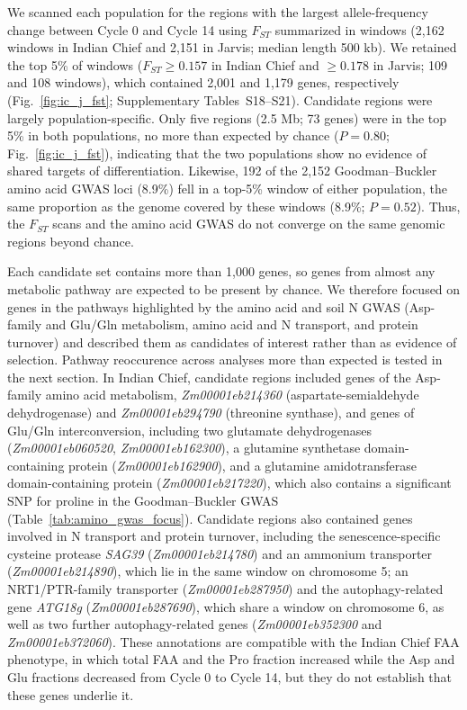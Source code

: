 We scanned each population for the regions with the largest allele-frequency change between Cycle 0 and Cycle 14 using $F_{ST}$ summarized in windows (2,162 windows in Indian Chief and 2,151 in Jarvis; median length 500 kb). We retained the top 5\% of windows ($F_{ST} \ge 0.157$ in Indian Chief and $\ge 0.178$ in Jarvis; 109 and 108 windows), which contained 2,001 and 1,179 genes, respectively (Fig.~\ref{fig:ic_j_fst}; Supplementary Tables~S18--S21). Candidate regions were largely population-specific. Only five regions (2.5 Mb; 73 genes) were in the top 5\% in both populations, no more than expected by chance ($P = 0.80$; Fig.~\ref{fig:ic_j_fst}), indicating that the two populations show no evidence of shared targets of differentiation. Likewise, 192 of the 2,152 Goodman--Buckler amino acid GWAS loci (8.9\%) fell in a top-5\% window of either population, the same proportion as the genome covered by these windows (8.9\%; $P = 0.52$). Thus, the $F_{ST}$ scans and the amino acid GWAS do not converge on the same genomic regions beyond chance.

Each candidate set contains more than 1,000 genes, so genes from almost any metabolic pathway are expected to be present by chance. We therefore focused on genes in the pathways highlighted by the amino acid and soil N GWAS (Asp-family and Glu/Gln metabolism, amino acid and N transport, and protein turnover) and described them as candidates of interest rather than as evidence of selection. Pathway reoccurence across analyses more than expected is tested in the next section. In Indian Chief, candidate regions included genes of the Asp-family amino acid metabolism, \textit{Zm00001eb214360} (aspartate-semialdehyde dehydrogenase) and \textit{Zm00001eb294790} (threonine synthase), and genes of Glu/Gln interconversion, including two glutamate dehydrogenases (\textit{Zm00001eb060520}, \textit{Zm00001eb162300}), a glutamine synthetase domain-containing protein (\textit{Zm00001eb162900}), and a glutamine amidotransferase domain-containing protein (\textit{Zm00001eb217220}), which also contains a significant SNP for proline in the Goodman--Buckler GWAS (Table~\ref{tab:amino_gwas_focus}). Candidate regions also contained genes involved in N transport and protein turnover, including the senescence-specific cysteine protease \textit{SAG39} (\textit{Zm00001eb214780}) and an ammonium transporter (\textit{Zm00001eb214890}), which lie in the same window on chromosome 5; an NRT1/PTR-family transporter (\textit{Zm00001eb287950}) and the autophagy-related gene \textit{ATG18g} (\textit{Zm00001eb287690}), which share a window on chromosome 6, as well as two further autophagy-related genes (\textit{Zm00001eb352300} and \textit{Zm00001eb372060}). These annotations are compatible with the Indian Chief FAA phenotype, in which total FAA and the Pro fraction increased while the Asp and Glu fractions decreased from Cycle 0 to Cycle 14, but they do not establish that these genes underlie it.

